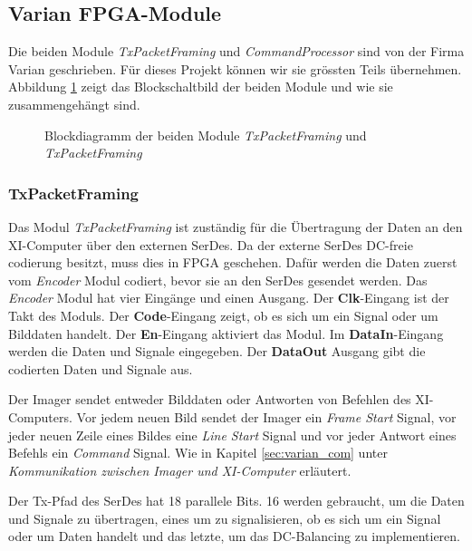 \documentclass{article}
\begin{document}
\subsection{Varian FPGA-Module}
Die beiden Module \textit{TxPacketFraming} und \textit{CommandProcessor} sind von der Firma Varian geschrieben. Für dieses Projekt können wir sie grössten Teils übernehmen. Abbildung \ref{fig:bd_fpga_varian} zeigt das Blockschaltbild der beiden Module und wie sie zusammengehängt sind.

\begin{figure}[tb]
    \caption{Blockdiagramm der beiden Module \textit{TxPacketFraming} und \textit{TxPacketFraming}}
    \label{fig:bd_fpga_varian}
\end{figure}

\subsubsection*{TxPacketFraming}
Das Modul \textit{TxPacketFraming} ist zuständig für die Übertragung der Daten an den XI-Computer über den externen SerDes. Da der externe SerDes DC-freie codierung besitzt, muss dies in FPGA geschehen. Dafür werden die Daten zuerst vom \textit{Encoder} Modul codiert, bevor sie an den SerDes gesendet werden. Das \textit{Encoder} Modul hat vier Eingänge und einen Ausgang.
Der \textbf{Clk}-Eingang ist der Takt des Moduls.
Der \textbf{Code}-Eingang zeigt, ob es sich um ein Signal oder um Bilddaten handelt.
Der \textbf{En}-Eingang aktiviert das Modul.
Im \textbf{DataIn}-Eingang werden die Daten und Signale eingegeben.
Der \textbf{DataOut} Ausgang gibt die codierten Daten und Signale aus.

Der Imager sendet entweder Bilddaten oder Antworten von Befehlen des XI-Computers. Vor jedem neuen Bild sendet der Imager ein \textit{Frame Start} Signal, vor jeder neuen Zeile eines Bildes eine \textit{Line Start} Signal und vor jeder Antwort eines Befehls ein \textit{Command} Signal. Wie in Kapitel \ref{sec:varian_com} unter \textit{Kommunikation zwischen Imager und XI-Computer} erläutert.

Der Tx-Pfad des SerDes hat 18 parallele Bits. 16 werden gebraucht, um die Daten und Signale zu übertragen, eines um zu signalisieren, ob es sich um ein Signal oder um Daten handelt und das letzte, um das DC-Balancing zu implementieren.
\end{document}
